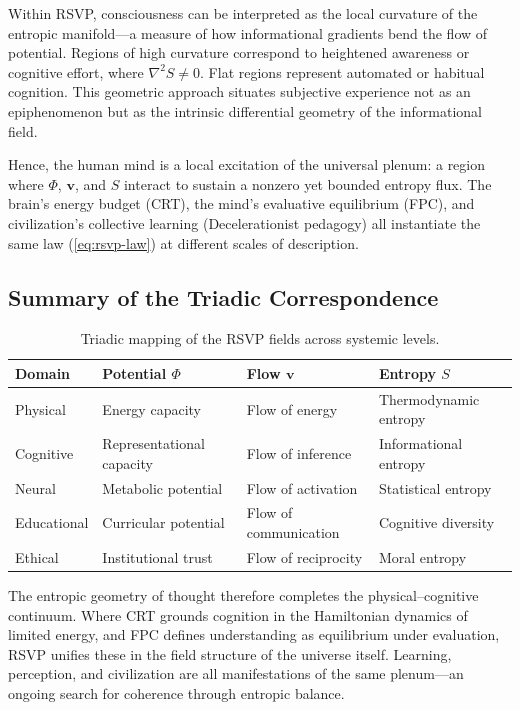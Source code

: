 \documentclass[12pt,a4paper]{article}
\begin{document}
Within RSVP, consciousness can be interpreted as the local curvature of the entropic manifold—a measure of how informational gradients bend the flow of potential.
Regions of high curvature correspond to heightened awareness or cognitive effort, where $\nabla^2 S \neq 0$.
Flat regions represent automated or habitual cognition.
This geometric approach situates subjective experience not as an epiphenomenon but as the intrinsic differential geometry of the informational field.

Hence, the human mind is a local excitation of the universal plenum: a region where $\Phi$, $\mathbf{v}$, and $S$ interact to sustain a nonzero yet bounded entropy flux.
The brain’s energy budget (CRT), the mind’s evaluative equilibrium (FPC), and civilization’s collective learning (Decelerationist pedagogy) all instantiate the same law (\ref{eq:rsvp-law}) at different scales of description.

\subsection{Summary of the Triadic Correspondence}

\begin{table}[h!]
\centering
\begin{tabular}{llll}
\toprule
\textbf{Domain} & \textbf{Potential $\Phi$} & \textbf{Flow $\mathbf{v}$} & \textbf{Entropy $S$}\\
\midrule
Physical & Energy capacity & Flow of energy & Thermodynamic entropy\\
Cognitive & Representational capacity & Flow of inference & Informational entropy\\
Neural & Metabolic potential & Flow of activation & Statistical entropy\\
Educational & Curricular potential & Flow of communication & Cognitive diversity\\
Ethical & Institutional trust & Flow of reciprocity & Moral entropy\\
\bottomrule
\end{tabular}
\caption{Triadic mapping of the RSVP fields across systemic levels.}
\end{table}

The entropic geometry of thought therefore completes the physical–cognitive continuum.
Where CRT grounds cognition in the Hamiltonian dynamics of limited energy, and FPC defines understanding as equilibrium under evaluation, RSVP unifies these in the field structure of the universe itself.
Learning, perception, and civilization are all manifestations of the same plenum—an ongoing search for coherence through entropic balance.
\end{document}
